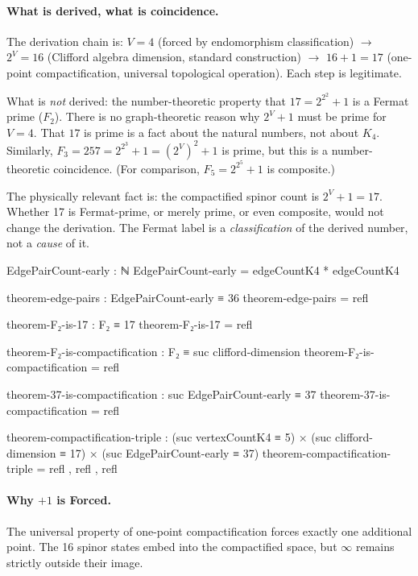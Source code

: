 \documentclass[11pt,a4paper]{book}
\begin{document}
\paragraph{What is derived, what is coincidence.}
The derivation chain is: $V=4$ (forced by endomorphism classification) $\to$ $2^V = 16$
(Clifford algebra dimension, standard construction) $\to$ $16+1 = 17$ (one-point
compactification, universal topological operation). Each step is legitimate.

What is \emph{not} derived: the number-theoretic property that $17 = 2^{2^2}+1$ is a
Fermat prime ($F_2$). There is no graph-theoretic reason why $2^V + 1$ must be prime
for $V=4$. That $17$ is prime is a fact about the natural numbers, not about $K_4$.
Similarly, $F_3 = 257 = 2^{2^3}+1 = (2^V)^2+1$ is prime, but this is a number-theoretic
coincidence. (For comparison, $F_5 = 2^{2^5}+1$ is composite.)

The physically relevant fact is: the compactified spinor count is $2^V + 1 = 17$.
Whether 17 is Fermat-prime, or merely prime, or even composite, would not change the
derivation. The Fermat label is a \emph{classification} of the derived number, not a
\emph{cause} of it.

\begin{code}
EdgePairCount-early : ℕ
EdgePairCount-early = edgeCountK4 * edgeCountK4

theorem-edge-pairs : EdgePairCount-early ≡ 36
theorem-edge-pairs = refl

theorem-F₂-is-17 : F₂ ≡ 17
theorem-F₂-is-17 = refl

theorem-F₂-is-compactification : F₂ ≡ suc clifford-dimension
theorem-F₂-is-compactification = refl

theorem-37-is-compactification : suc EdgePairCount-early ≡ 37
theorem-37-is-compactification = refl

theorem-compactification-triple : 
  (suc vertexCountK4 ≡ 5) × (suc clifford-dimension ≡ 17) × (suc EdgePairCount-early ≡ 37)
theorem-compactification-triple = refl , refl , refl
\end{code}

\paragraph{Why $+1$ is Forced.}
The universal property of one-point compactification forces exactly one additional 
point. The 16 spinor states embed into the compactified space, but $\infty$ remains 
strictly outside their image.
\end{document}

